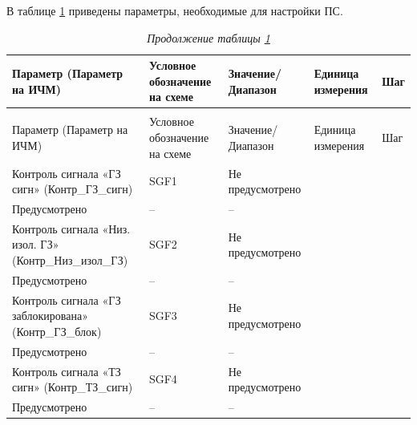 
\par
В таблице \ref{ps:tbl1} приведены параметры, необходимые для настройки ПС. 

\footnotesize
\begin{longtable}{|>{\centering\arraybackslash}m{5.3cm}|>{\centering\arraybackslash}m{3.3cm}|>{\centering\arraybackslash}m{4.2cm}|>{\centering\arraybackslash}m{1.8cm}|>{\centering\arraybackslash}m{1cm}|}
\caption{Параметры для настройки предупредительной сигнализации\hfill\vspace{-0.5\baselineskip}}\label{ps:tbl1}\\ 
\hline
\rowcolor{unimain!40}
Параметр (Параметр на ИЧМ) & Условное обозначение на схеме & Значение/ Диапазон & Единица измерения & Шаг \\ 
\hline
\endfirsthead
\caption*{\hspace{3pt}\emph{Продолжение таблицы \ref{ps:tbl1}\hfill\vspace{-0.5\baselineskip}}} \\ %
\hline
\rowcolor{unimain!40}
Параметр (Параметр на ИЧМ) & Условное обозначение на схеме & Значение/ Диапазон & Единица измерения & Шаг \\ 
\endhead
\endfoot
\endlastfoot
\centering Контроль сигнала «ГЗ сигн» (Контр\_ГЗ\_сигн)  & \centering SGF1 & \centering Не предусмотрено \\ Предусмотрено & \centering -- & \centering \arraybackslash -- \\
\hline
\centering Контроль сигнала «Низ. изол. ГЗ» (Контр\_Низ\_изол\_ГЗ)  & \centering SGF2 & \centering Не предусмотрено \\ Предусмотрено & \centering -- & \centering \arraybackslash -- \\
\hline
\centering Контроль сигнала «ГЗ заблокирована» (Контр\_ГЗ\_блок)  & \centering SGF3 & \centering Не предусмотрено \\ Предусмотрено & \centering -- & \centering \arraybackslash -- \\
\hline
\centering Контроль сигнала «ТЗ сигн» (Контр\_ТЗ\_сигн)  & \centering SGF4 & \centering Не предусмотрено \\ Предусмотрено & \centering -- & \centering \arraybackslash -- \\

\end{longtable}
